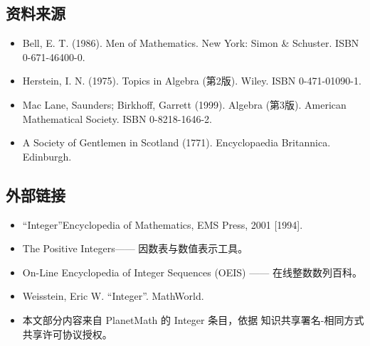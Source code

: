 \subsection{资料来源}
\begin{itemize}
\item Bell, E. T. (1986). Men of Mathematics. New York: Simon & Schuster. ISBN 0-671-46400-0.
\item Herstein, I. N. (1975). Topics in Algebra (第2版). Wiley. ISBN 0-471-01090-1.
\item Mac Lane, Saunders; Birkhoff, Garrett (1999). Algebra (第3版). American Mathematical Society. ISBN 0-8218-1646-2.
\item A Society of Gentlemen in Scotland (1771). Encyclopaedia Britannica. Edinburgh.
\end{itemize}
\subsection{外部链接}
\begin{itemize}
\item “Integer”Encyclopedia of Mathematics, EMS Press, 2001 [1994].
\item The Positive Integers—— 因数表与数值表示工具。
\item On-Line Encyclopedia of Integer Sequences (OEIS) —— 在线整数数列百科。
\item Weisstein, Eric W. “Integer”. MathWorld.
\item 本文部分内容来自 PlanetMath 的 Integer 条目，依据 知识共享署名-相同方式共享许可协议授权。
\end{itemize}
